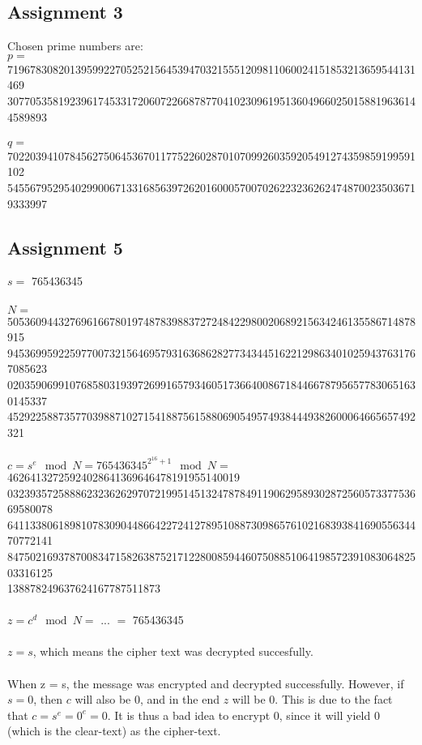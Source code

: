 \documentclass[11pt,a4paper]{article}
\begin{document}
\subsection{Assignment 3}
Chosen prime numbers are: \\
$p = $ 719678308201395992270525215645394703215551209811060024151853213659544131469\\3077053581923961745331720607226687877041023096195136049660250158819636144589893\\\\
$q = $ 702203941078456275064536701177522602870107099260359205491274359859199591102\\5455679529540299006713316856397262016000570070262232362624748700235036719333997
\subsection{Assignment 5}
$s = $ 765436345
\\\\$N =$ 505360944327696166780197487839883727248422980020689215634246135586714878915\\9453699592259770073215646957931636862827734344516221298634010259437631767085623\\0203590699107685803193972699165793460517366400867184466787956577830651630145337\\452922588735770398871027154188756158806905495749384449382600064665657492321 
\\\\$c = s^e\mod N = 765436345^{2^{16}+1} \mod N = $ 46264132725924028641369646478191955140019\\03239357258886232362629707219951451324787849119062958930287256057337753669580078\\64113380618981078309044866422724127895108873098657610216839384169055634470772141\\84750216937870083471582638752171228008594460750885106419857239108306482503316125\\138878249637624167787511873
\\\\$z = c^d\mod N = $ ... $ = $ 765436345
\\\\$z = s$, which means the cipher text was decrypted succesfully.
\\\\ 
When z = s, the message was encrypted and decrypted successfully. However, if $s = 0$, then $c$ will also be $0$, and in the end $z$ will be $0$. This is due to the fact that $c = s^e = 0^e = 0$. It is thus a bad idea to encrypt $0$, since it will yield $0$ (which is the clear-text) as the cipher-text.
\end{document}
